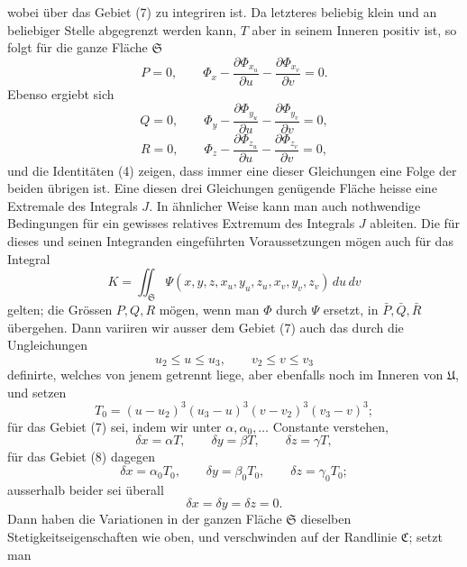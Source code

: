 \documentclass[11pt,a4paper,leqno]{article}
\begin{document}
wobei über das Gebiet (7) zu integriren ist. Da letzteres beliebig
klein und an beliebiger Stelle abgegrenzt werden kann, $T$ aber in seinem
Inneren positiv ist, so folgt für die ganze Fläche $\mathfrak{S}$
\[
P=0,\qquad
\Phi_x-\frac{\partial\Phi_{x_u}}{\partial u}
-\frac{\partial\Phi_{x_v}}{\partial v}=0.
\]
Ebenso ergiebt sich
\[
Q=0,\qquad
\Phi_y-\frac{\partial\Phi_{y_u}}{\partial u}
-\frac{\partial\Phi_{y_v}}{\partial v}=0,
\]
\[
R=0,\qquad
\Phi_z-\frac{\partial\Phi_{z_u}}{\partial u}
-\frac{\partial\Phi_{z_v}}{\partial v}=0,
\]
und die Identitäten (4) zeigen, dass immer eine dieser Gleichungen
eine Folge der beiden übrigen ist. Eine diesen drei Gleichungen
genügende Fläche heisse eine Extremale des Integrals $J$.
In ähnlicher Weise kann man auch nothwendige Bedingungen
für ein gewisses relatives Extremum des Integrals $J$ ableiten.
Die für dieses und seinen Integranden eingeführten Voraussetzungen
mögen auch für das Integral
\[
K=\iint_{\mathfrak{S}}
\Psi(x,y,z,x_u,y_u,z_u,x_v,y_v,z_v)\,du\,dv
\]
gelten; die Grössen $P,Q,R$ mögen, wenn man $\Phi$ durch $\Psi$ ersetzt,
in $\bar P,\bar Q,\bar R$ übergehen. Dann variiren wir ausser dem Gebiet
(7) auch das durch die Ungleichungen
\begin{equation}\tag{8}
u_2\leq u\leq u_3,\qquad v_2\leq v\leq v_3
\end{equation}
definirte, welches von jenem getrennt liege, aber ebenfalls noch
im Inneren von $\mathfrak{U}$, und setzen
\[
T_0=(u-u_2)^3(u_3-u)^3(v-v_2)^3(v_3-v)^3;
\]
für das Gebiet (7) sei, indem wir unter $\alpha,\alpha_0,\ldots$ Constante verstehen,
\[
\delta x=\alpha T,\qquad \delta y=\beta T,\qquad \delta z=\gamma T,
\]
für das Gebiet (8) dagegen
\[
\delta x=\alpha_0T_0,\qquad \delta y=\beta_0T_0,
\qquad \delta z=\gamma_0T_0;
\]
ausserhalb beider sei überall
\[
\delta x=\delta y=\delta z=0.
\]
Dann haben die Variationen in der ganzen Fläche $\mathfrak{S}$ dieselben
Stetigkeitseigenschaften wie oben, und verschwinden auf der
Randlinie $\mathfrak{C}$; setzt man
\end{document}
